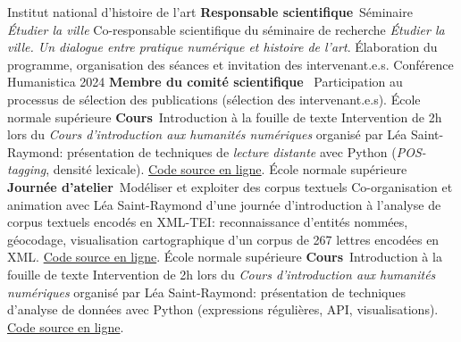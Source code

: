 	{%
		Institut national d'histoire de l'art}
	{%
		\textbf{Responsable scientifique}~Séminaire \textit{Étudier la ville}}
	{%
		Co-responsable scientifique du séminaire de recherche \textit{Étudier la ville. Un dialogue entre pratique numérique et histoire de l'art}. Élaboration du programme, organisation des séances et invitation des intervenant.e.s.}
	{%
		Conférence Humanistica 2024}
	{%
		\textbf{Membre du comité scientifique}~}
	{%
		Participation au processus de sélection des publications (sélection des intervenant.e.s).}
	{%
		École normale supérieure}
	{%
		\textbf{Cours}~Introduction à la fouille de texte}
	{%
		Intervention de 2h lors du \textit{Cours d'introduction aux humanités numériques} organisé par Léa Saint-Raymond: présentation de techniques de \textit{lecture distante} avec Python (\textit{POS-tagging}, densité lexicale). \href{https://github.com/paulhectork/cours_ens2024_fouille_de_texte.git}{Code source en ligne}.}
	{%
		École normale supérieure}
	{%
		\textbf{Journée d'atelier}~Modéliser et exploiter des corpus textuels}
	{%
		Co-organisation et animation avec Léa Saint-Raymond d'une journée d'introduction à l'analyse de corpus textuels encodés en XML-TEI: reconnaissance d'entités nommées, géocodage, visualisation cartographique d'un corpus de 267 lettres encodées en XML. \href{https://github.com/paulhectork/cours_ens2023_xmltei}{Code source en ligne}.}
	{%
		École normale supérieure}
	{%
		\textbf{Cours}~Introduction à la fouille de texte}
	{%
		Intervention de 2h lors du \textit{Cours d'introduction aux humanités numériques} organisé par Léa Saint-Raymond: présentation de techniques d'analyse de données avec Python (expressions régulières, API, visualisations). \href{https://github.com/paulhectork/cours_ens2024_fouille_de_texte.git}{Code source en ligne}.}

